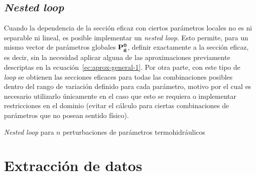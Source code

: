 \documentclass[11pt]{article}
\renewcommand{\vec}[1]{\ensuremath\mathbf{#1}}
\begin{document}
\subsection{\emph{Nested loop}} \label{subsec:nested-loop}

Cuando la dependencia de la sección eficaz con ciertos parámetros locales no es ni separable ni lineal, es posible implementar un \emph{nested loop}. Esto permite, para un mismo vector de parámetros globales $\vec{P^0_g}$, definir exactamente a la sección eficaz, es decir, sin la necesidad aplicar alguna de las aproximaciones previamente descriptas en la ecuación~\ref{ec:aprox-general-1}. Por otra parte, con este tipo de \emph{loop} se obtienen las secciones eficaces para todas las combinaciones posibles dentro del rango de variación definido para cada parámetro, motivo por el cual es necesario utilizarlo únicamente en el caso que esto se requiera o implementar restricciones en el dominio (evitar el cálculo para ciertas combinaciones de parámetros que no posean sentido físico).

\medskip
\begin{algorithm}[H]
 
 
 \caption{\emph{Nested loop} para $n$ perturbaciones de parámetros termohidráulicos}
\end{algorithm}
\medskip

\section{Extracción de datos}
\end{document}
